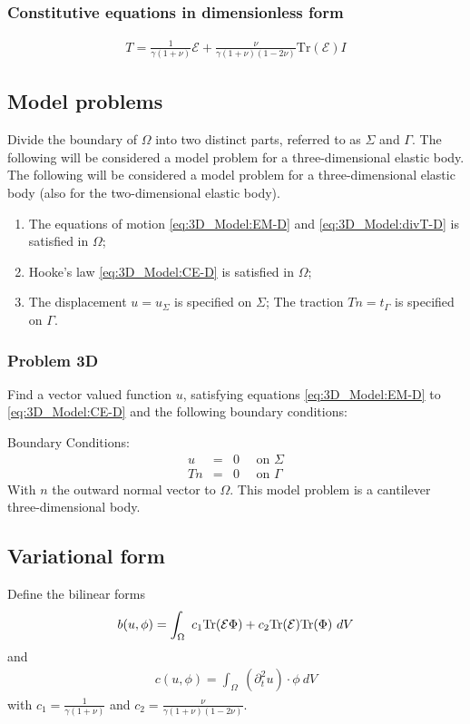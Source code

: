 \subsubsection*{Constitutive equations in dimensionless form}\label{sssec:3D_Model:ConstitutiveEquationsDimensionless}
\begin{eqnarray}
	T = \frac{1}{\gamma(1+\nu)} \mathcal{E} + \frac{\nu}{\gamma(1+\nu)(1-2\nu)}\textrm{Tr}(\mathcal{E})I \label{eq:3D_Model:CE-D}
\end{eqnarray}

\subsection{Model problems}\label{ssec:3D_Model}
Divide the boundary of $\Omega$ into two distinct parts, referred to as $\Sigma$ and $\Gamma$. The following will be considered a model problem for a three-dimensional elastic body. 
The following will be considered a model problem for a three-dimensional elastic body (also for the two-dimensional elastic body).
\begin{enumerate}
	\item[] The equations of motion \eqref{eq:3D_Model:EM-D} and \eqref{eq:3D_Model:divT-D} is satisfied in $\Omega$;
	\item[] Hooke's law \eqref{eq:3D_Model:CE-D} is satisfied in $\Omega$;
	\item[] The displacement $u = u_\Sigma$ is specified on
		$\Sigma$; The traction $Tn = t_\Gamma$ is specified on
		$\Gamma$.
\end{enumerate} \label{sym:n}\label{sym:SigmaGamma}

\subsubsection{Problem 3D}
Find a vector valued function $u$, satisfying equations
\eqref{eq:3D_Model:EM-D} to \eqref{eq:3D_Model:CE-D} and the following boundary
conditions:

Boundary Conditions:
\begin{eqnarray*}
	u & = & 0 \quad \textrm{ on } \Sigma\\
	Tn & = & 0 \quad \textrm{ on } \Gamma
\end{eqnarray*} With $n$ the outward normal vector to $\Omega$. This model problem is a cantilever three-dimensional body.

\subsection{Variational form}\label{ssec:3D_Model:VariationalForm}
Define the bilinear forms
\begin{eqnarray}
	b(u,\phi) = \int_\Omega~c_1\textrm{Tr}({\cal E}\Phi)+ c_2\textrm{Tr}({\cal E})
	\textrm{Tr}(\Phi) ~dV \label{eq:3D_Model:Bilinear}
\end{eqnarray}\label{sym:b}
and
\begin{eqnarray}
	c(u,\phi) = \int_\Omega~ (\partial^2_t u) \cdot \phi~dV \label{eq:3D_Model:Bilinear_c}
\end{eqnarray}
with $\displaystyle c_1 = \frac{1}{\gamma(1+\nu)}$ and $\displaystyle c_2 = \frac{\nu}{\gamma(1+\nu)(1-2\nu)}$.

